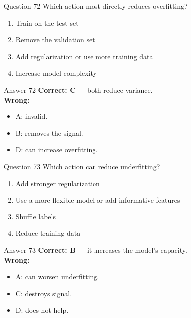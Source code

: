 \documentclass[aspectratio=169,11pt]{beamer}
\begin{document}
\begin{frame}{Question 72}
Which action most directly reduces overfitting?
\begin{enumerate}[label=\Alph*.]
\item Train on the test set
\item Remove the validation set
\item Add regularization or use more training data
\item Increase model complexity
\end{enumerate}
\end{frame}
\begin{frame}{Answer 72}
\textbf{Correct: C} --- both reduce variance.\\
\vspace{0.5em}
\textbf{Wrong:}
\begin{itemize}
\item A: invalid.
\item B: removes the signal.
\item D: can increase overfitting.
\end{itemize}
\end{frame}

\begin{frame}{Question 73}
Which action can reduce underfitting?
\begin{enumerate}[label=\Alph*.]
\item Add stronger regularization
\item Use a more flexible model or add informative features
\item Shuffle labels
\item Reduce training data
\end{enumerate}
\end{frame}
\begin{frame}{Answer 73}
\textbf{Correct: B} --- it increases the model's capacity.\\
\vspace{0.5em}
\textbf{Wrong:}
\begin{itemize}
\item A: can worsen underfitting.
\item C: destroys signal.
\item D: does not help.
\end{itemize}
\end{frame}
\end{document}

